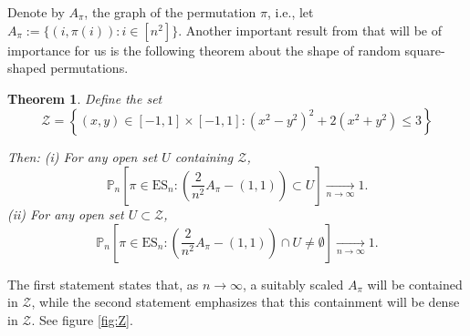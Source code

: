 \documentclass[11pt, a4paper]{article}
\theoremstyle{compact}
\newtheorem{theorem}{Theorem}[section]
\begin{document}
 Denote by $A_\pi$,  the graph of the permutation $\pi$, i.e., let $A_{\pi}:=\{(i,\pi(i)):i\in [n^2]\}$. Another important result from \cite{tab_san} that will be of importance for us is the following theorem about the shape of random square-shaped permutations.
\begin{theorem}\label{shape_square}
    Define the set
$$
\mathcal{Z}=\left\{(x, y) \in[-1,1] \times[-1,1]:\left(x^2-y^2\right)^2+2\left(x^2+y^2\right) \leq 3\right\}
$$

Then: (i) For any open set $U$ containing $\mathcal{Z}$,
$$
\mathbb{P}_n\left[\pi \in  \mathrm{ES}_n:\left(\frac{2}{n^2} A_\pi-(1,1)\right) \subset U\right] \xrightarrow[n \rightarrow \infty]{ } 1 .
$$
(ii) For any open set $U \subset \mathcal{Z}$,
$$
\mathbb{P}_n\left[\pi \in \mathrm{ES}_n:\left(\frac{2}{n^2} A_\pi-(1,1)\right) \cap U \neq \emptyset\right] \underset{n \rightarrow \infty}{\longrightarrow} 1 .
$$
\end{theorem}
 The first statement states that, as $n \rightarrow \infty$, a suitably scaled $A_\pi$ will be contained in $\mathcal{Z}$, while the second statement emphasizes that this containment will be dense in $\mathcal{Z}$. See figure \ref{fig:Z}. \\
\end{document}
